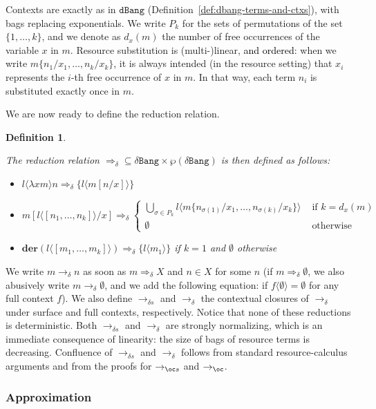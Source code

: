 \documentclass[10pt,a4paper]{article}
\newtheorem{definition}[theorem]{Definition}
\newcommand{\<}{\langle}
\renewcommand{\>}{\rangle}
\newcommand{\der}[1]{\ensuremath{\mathbf{der}(#1)}}
\newcommand{\dbang}{\ensuremath{\mathtt{dBang}}}
\newcommand{\dbangres}{\ensuremath{\mathtt{\delta Bang}}}
\newcommand{\todbs}{\to_{\oc s}} %
\newcommand{\todbf}{\to_{\oc}} %
\newcommand{\Todbr}{\Rightarrow_{\delta}} %
\newcommand{\todbr}{\to_{\delta}} %
\newcommand{\todbrs}{\to_{\delta s}} %
\newcommand{\todbrf}{\to_{\delta}} %
\newcommand{\es}[2]{[#1/#2]}
\newcommand{\fnl}[1]{\textcolor{black}{#1}}
\newcommand{\nativeemdash}{\ifmmode\text{\textemdash}\else\textemdash\fi}
\begin{document}
Contexts are exactly
as in \dbang{}
(Definition~\ref{def:dbang-terms-and-ctxs}), with bags replacing exponentials.
We write $P_k$ for the sets of
permutations of the set $\{1,\dots ,k\}$, and we denote as $d_x(m)$ the number of
free occurrences of the variable $x$ in $m$. Resource substitution is
(multi-)linear, \fnl{and ordered}: when we write
$m\{n_1/x_1,\dots ,n_k/x_k\}$, it is always intended (in the resource setting) 
that $x_i$ represents the $i$-th free occurrence of $x$ in $m$. In that way,
each term $n_i$ is substituted exactly once in $m$.

We are now ready to define the reduction relation.
\begin{definition}~
	\label{def:dbang-taylor-reductions}
	
	The reduction relation $\Todbr\subseteq\dbangres\times\mathbb
	\wp(\dbangres)$ is
	then defined as follows:
	\begin{itemize}
		\item $l\<\lambda x m\>n \Todbr \{l\<m\es nx\>\}$
		\item $m\es{l\<[n_1,\dots ,n_k]\>}x \Todbr 
		\left\{\begin{array}{ll}
			\displaystyle{\bigcup_{\sigma\in
			P_k}}l\<m\{n_{\sigma(1)}/x_1,\dots ,n_{\sigma(k)}/x_k\}\> & \text{ if }
			k=d_x(m) \\
			\emptyset & \text{ otherwise}
		\end{array}\right.$
		\item $\der{l\<[m_1,\dots ,m_k]\>} \Todbr \{l\<m_1\>\}$ if $k=1$ and
			$\emptyset$ otherwise
	\end{itemize}
\end{definition}

%
We write $m\todbr n$ as soon as $m\Todbr X$ and $n\in X$ for some $n$ (if
$m\Todbr \emptyset$, we also abusively write $m\todbr \emptyset$, and we add the
following equation: if $f\<\emptyset\>=\emptyset$ for any full context $f$). We
also define $\todbrs$ and $\todbrf$ the contextual closures of $\todbr$ under
surface and full contexts, respectively. Notice that none of these reductions is
deterministic.
%
Both $\todbrs$ and $\todbrf$ are strongly normalizing, which is an immediate
consequence of linearity: the size of bags of resource terms is decreasing. Confluence of $\todbrs$ and $\todbrf$ follows from standard resource-calculus arguments and from the proofs for
$\todbs$ and $\todbf$. 

\subsubsection{Approximation}
\label{subsubsec:approx-taylor}
\end{document}

